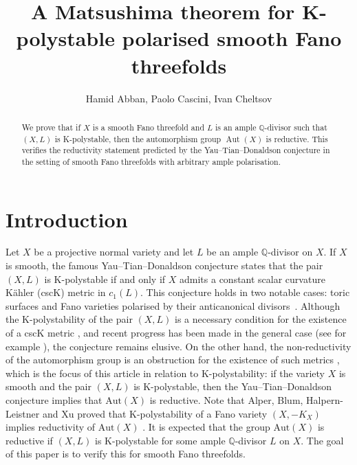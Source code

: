 \documentclass[12pt]{amsart}
\author{Hamid Abban, Paolo Cascini, Ivan Cheltsov}
\title{A Matsushima theorem for K-polystable polarised smooth Fano threefolds}
\theoremstyle{definition}
\theoremstyle{remark}
\let\origmaketitle\maketitle
\def\maketitle{
  \begingroup
  \def\uppercasenonmath##1{} %
  \let\MakeUppercase\relax %
  \origmaketitle
  \endgroup
}
\begin{document}
\begin{abstract}
We prove that if $X$ is a smooth Fano threefold and $L$ is an ample $\mathbb{Q}$-divisor such that $(X,L)$ is K-polystable,
then the automorphism group $\operatorname{Aut}(X)$ is reductive.
This verifies the reductivity statement predicted by the Yau--Tian--Donaldson conjecture in the setting of smooth Fano threefolds
with arbitrary ample polarisation.
\end{abstract}



\address{\textit{Hamid Abban}\newline
\textnormal{University of Nottingham, Nottingham, England
\newline
\texttt{hamid.abban@nottingham.ac.uk}}}

\address{\textit{Paolo Cascini}\newline
\textnormal{Imperial College, London, England
\newline
\texttt{p.cascini@imperial.ac.uk}}}

\address{ \textit{Ivan Cheltsov}\newline
\textnormal{University of Edinburgh, Edinburgh, Scotland
\newline
\texttt{i.cheltsov@ed.ac.uk}}}

\maketitle

\section{Introduction}
\label{section:intro}

Let $X$ be a projective normal variety and let $L$ be an ample $\mathbb{Q}$-divisor on $X$.
If $X$ is smooth, the famous Yau--Tian--Donaldson conjecture states that the pair $(X,L)$ is K-polystable if and only if
$X$ admits a constant scalar curvature K\"ahler (cscK) metric in $c_1(L)$.
This conjecture holds in two notable cases: toric surfaces \cite{CodogniStoppa,Donaldson2002,Donaldson2009}
and Fano varieties polarised by their anticanonical divisors~\cite{CDS}. Although the K-polystability of the pair $(X,L)$ is a necessary condition for the existence of a cscK metric \cite{BDL16,Stoppa}, and recent progress has been made in the general case (see for example \cite{BJ,Li2022}), the conjecture remains elusive. On the other hand,
the non-reductivity of the automorphism group is an obstruction for the existence of such metrics \cite{Mat57}, which is the focus of this article in relation to K-polystability: if the variety $X$ is smooth and the pair $(X,L)$ is K-polystable, then the Yau--Tian--Donaldson conjecture implies that $\mathrm{Aut}(X)$ is reductive.
Note that Alper, Blum, Halpern-Leistner and Xu proved that K-polystability of a Fano variety $(X,-K_X)$ implies reductivity of $\mathrm{Aut}(X)$ \cite{AlperBlumHalpernLeistnerXu}.
It is expected that the group $\mathrm{Aut}(X)$ is reductive if $(X,L)$ is K-polystable for some ample $\mathbb{Q}$-divisor $L$ on $X$. The goal of this paper is to verify this for smooth Fano threefolds.
\end{document}
